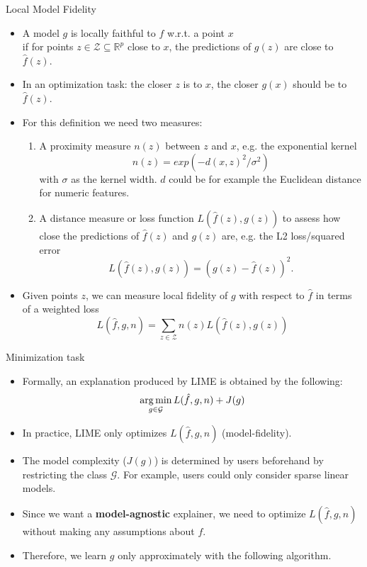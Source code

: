 \documentclass[aspectratio=169]{../latex_main/tntbeamer}  %
\begin{document}
\begin{frame}{Local Model Fidelity}
\vspace{-2em}
 		\begin{itemize}
 			\item A model $g$ is locally faithful to $f$ w.r.t. a point $x$\\ if for points $z \in \mathcal{Z} \subseteq \mathbb{R}^p$ close to $x$, the predictions of $g(z)$ are close to $\hat{f}(z)$. 
 			\pause
 			 \item In an optimization task: the closer $z$ is to $x$, the closer $g(x)$ should be to $\hat{f}(z)$.  
 			 \pause
 			\item For this definition we need two measures:
 			\begin{enumerate}
 				\item A proximity measure $n(z)$ between $z$ and $x$, e.g. the exponential kernel
 				$$n(z) = exp(-d(x, z)^2/\sigma^2)$$ 
 				with $\sigma$ as the kernel width. $d$ could be for example the Euclidean distance for numeric features. 
 				\pause
 				\item A distance measure or loss function $L(\hat{f}(z), g(z))$ to assess how close the predictions of $\hat{f}(z)$ and $g(z)$ are, e.g. the L2 loss/squared error $$L(\hat{f}(z), g(z)) = (g(z) - \hat{f}(z))^2.$$ 
 			\end{enumerate}
 			\pause
 			\item Given points $z$, we can measure local fidelity of $g$ with respect to $\hat{f}$ in terms of a weighted loss
 			\begin{equation}
 				L(\hat{f}, g, n) = \sum_{z \in \mathcal{Z}} n(z) L(\hat{f}(z), g(z))
 				\label{eq:optim}
 			\end{equation}
 		\end{itemize}
\end{frame}
\begin{frame}{Minimization task}
	\begin{itemize}
		\item Formally, an explanation produced by LIME is obtained by the following: 
		$$ \operatorname*{arg\,min}_{g \in \mathcal{G}} L(\hat{f}, g, n) + J(g)$$
		\item In practice, LIME only optimizes $L(\hat{f}, g, n)$ (model-fidelity). 	
		\item The model complexity ($J(g)$) is determined by users beforehand by restricting the class $\mathcal{G}$. For example, users could only consider sparse linear models. 
		\item Since we want a \textbf{model-agnostic} explainer, we need to optimize $L(\hat{f}, g, n)$ without making any assumptions about $f$. 
		\item Therefore, we learn $g$ only approximately with the following algorithm.  
		\end{itemize}
\end{frame} 
\end{document}
